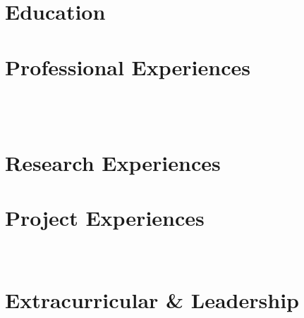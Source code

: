 \documentclass[a4paper,8pt]{article}
\begin{document}


\section{Education}


\section{Professional Experiences}

\\ [2pt]

\\ [2pt]


\section{Research Experiences}


\section{Project Experiences}

\\ [2pt]


\section{Extracurricular \& Leadership}

\\ [2pt]

\\ [2pt]

\end{document}
